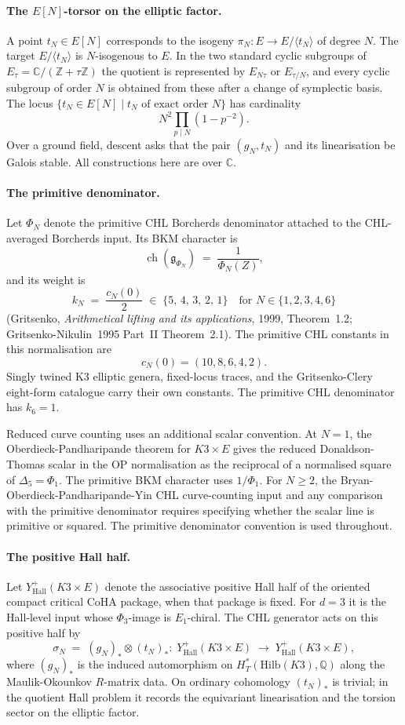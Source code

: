 \documentclass{article}
\providecommand{\bC}{\mathbb{C}}
\providecommand{\bZ}{\mathbb{Z}}
\providecommand{\bQ}{\mathbb{Q}}
\providecommand{\fg}{\mathfrak{g}}
\begin{document}
\paragraph{The $E[N]$-torsor on the elliptic factor.}
A point $t_N \in E[N]$ corresponds to the isogeny
$\pi_N \colon E \to E/\langle t_N\rangle$ of degree $N$.
The target $E/\langle t_N\rangle$ is $N$-isogenous to $E$. In the two
standard cyclic subgroups of $E_\tau=\bC/(\bZ+\tau\bZ)$ the quotient is
represented by $E_{N\tau}$ or $E_{\tau/N}$, and every cyclic subgroup of
order $N$ is obtained from these after a change of symplectic basis.
The locus
$\{t_N \in E[N] \mid t_N \text{ of exact order } N\}$ has
cardinality
\[
  N^2 \prod_{p\mid N}(1-p^{-2}).
\]
Over a ground field, descent asks that the pair $(g_N,t_N)$ and its
linearisation be Galois stable. All constructions here are over $\bC$.

\paragraph{The primitive denominator.}
Let $\Phi_N$ denote the primitive CHL Borcherds denominator attached to
the CHL-averaged Borcherds input. Its BKM character is
\[
  \operatorname{ch}(\fg_{\Phi_N})
  \;=\; \frac{1}{\Phi_N(Z)},
\]
and its weight is
\[
  k_N \;=\; \frac{c_N(0)}{2}
  \;\in\; \{5,\, 4,\, 3,\, 2,\, 1\}
  \quad\text{for } N \in \{1,2,3,4,6\}
\]
(Gritsenko, \emph{Arithmetical lifting and its applications}, 1999,
Theorem~1.2; Gritsenko-Nikulin~1995 Part~II Theorem~2.1). The primitive
CHL constants in this normalisation are
\[
  c_N(0)=(10,8,6,4,2).
\]
Singly twined K3 elliptic genera, fixed-locus traces, and the
Gritsenko-Clery eight-form catalogue carry their own constants. The
primitive CHL denominator has $k_6=1$.

Reduced curve counting uses an additional scalar convention. At
$N=1$, the Oberdieck-Pandharipande theorem for $K3\times E$ gives the
reduced Donaldson-Thomas scalar in the OP normalisation as the reciprocal
of a normalised square of $\Delta_5=\Phi_1$. The primitive BKM character
uses $1/\Phi_1$. For $N\geq2$, the Bryan-Oberdieck-Pandharipande-Yin CHL
curve-counting input and any comparison with the primitive denominator
requires specifying whether the scalar line is primitive or squared.
The primitive denominator convention is used throughout.

\paragraph{The positive Hall half.}
Let $Y^+_{\mathrm{Hall}}(K3\times E)$ denote the associative positive
Hall half of the oriented compact critical CoHA package, when that
package is fixed. For $d=3$ it is the Hall-level input whose
$\Phi_3$-image is $E_1$-chiral. The CHL generator acts on this positive
half by
\[
  \sigma_N \;=\; (g_N)_* \otimes (t_N)_* \colon\;
  Y^+_{\mathrm{Hall}}(K3\times E)
  \;\longrightarrow\;
  Y^+_{\mathrm{Hall}}(K3\times E),
\]
where $(g_N)_*$ is the induced automorphism on
$H^*_{T}(\mathrm{Hilb}(K3), \bQ)$ along the Maulik-Okounkov
$R$-matrix data. On ordinary cohomology $(t_N)_*$ is trivial; in the
quotient Hall problem it records the equivariant linearisation and the
torsion sector on the elliptic factor.
\end{document}
